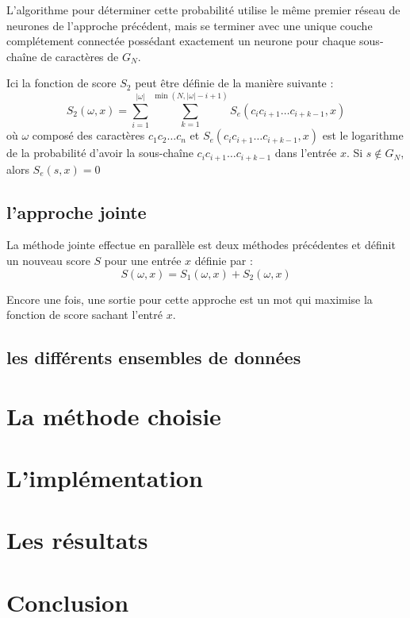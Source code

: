 \documentclass{article}
\begin{document}
L'algorithme pour déterminer cette probabilité utilise le même premier réseau de neurones de l'approche précédent, mais se terminer avec une unique couche complétement connectée possédant exactement un neurone pour chaque sous-chaîne de caractères de $G_N$. 

Ici la fonction de score $S_2$ peut être définie de la manière suivante :
$$S_2(\omega,x) = \sum_{i=1}^{|\omega|} \sum_{k=1}^{\min(N,|\omega| -i +1)} S_e(c_ic_{i+1}\dots c_{i+k-1},x)$$
où $\omega$ composé des caractères $c_1c_2\dots c_n$ et $S_e(c_ic_{i+1}\dots c_{i+k-1},x)$ est le logarithme de la probabilité d'avoir la sous-chaîne $c_ic_{i+1}\dots c_{i+k-1}$ dans l'entrée $x$. Si $s \notin G_N$, alors $S_e(s,x) = 0$

\subsection{l'approche jointe}
La méthode jointe effectue en parallèle est deux méthodes précédentes et définit un nouveau score $S$ pour une entrée $x$ définie par :
$$ S(\omega,x) = S_1(\omega,x) + S_2(\omega,x)$$

Encore une fois, une sortie pour cette approche est un mot qui maximise la fonction de score sachant l'entré $x$.



\subsection{les différents ensembles de données}

\section{La méthode choisie}

\section{L'implémentation}

\section{Les résultats}

\section{Conclusion}
\end{document}
